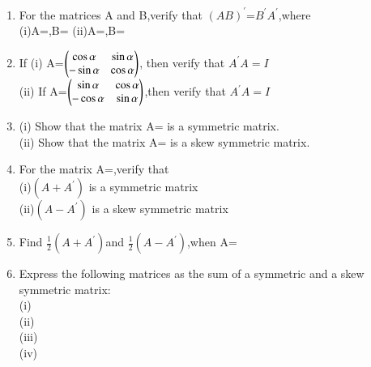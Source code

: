 \begin{enumerate}[label=\arabic*.,ref=\thesubsection.\theenumi]
\item For the matrices A and B,verify that $(AB)^{'}$=$B^{'}A^{'}$,where\\
(i)A=,B= (ii)A=,B=
\item If (i)  A=$\begin{pmatrix}\cos\alpha &\sin\alpha\\-\sin\alpha &\cos\alpha\end{pmatrix}$, then verify that $A^{'}A=I$\\
        (ii) If A=$\begin{pmatrix}\sin\alpha &\cos\alpha\\-\cos\alpha &\sin\alpha\end{pmatrix}$,then verify that $A^{'}A=I$\\
  \item (i) Show that the matrix A= is a symmetric matrix.\\
  (ii) Show that the matrix A= is a skew symmetric matrix.\\
  \item For the matrix A=,verify that\\
  (i)$(A+A^{'})$ is a symmetric matrix\\
  (ii)$(A-A^{'})$ is a skew symmetric matrix\\
  
  \item Find $\frac{1}{2}(A+A^{'}) $and $\frac{1}{2}(A-A^{'})$,when A=\\
  \item Express the following matrices as the sum of a symmetric and a skew symmetric matrix:\\
  (i)  \\(ii)  \\
  (iii) \\ (iv) \\
  

\end{enumerate}
